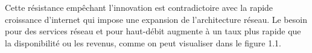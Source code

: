 






Cette résistance empêchant l'innovation est contradictoire avec la rapide croissance d'internet qui impose une expansion de l'architecture réseau. 
Le besoin pour des services réseau et pour haut-débit augmente à un taux plus rapide que la disponibilité ou les revenus, comme on peut visualiser dans le figure 1.1.



